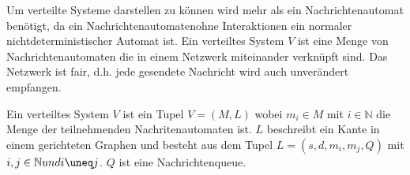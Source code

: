 Um verteilte Systeme darstellen zu können wird mehr als ein Nachrichtenautomat
benötigt, da ein Nachrichtenautomatenohne Interaktionen ein normaler
nichtdeterministischer Automat ist. Ein verteiltes System $V$ ist eine Menge von
Nachrichtenautomaten die in einem Netzwerk miteinander verknüpft sind.
Das Netzwerk ist fair, d.h. jede gesendete Nachricht wird auch unverändert
empfangen.~\cite{bickford2003logic}

\begin{defi}
  Ein verteiltes System $V$ ist ein Tupel $V=(M,L)$ wobei $m_i\in M$ mit $i\in
  \mathbb{N}$ die Menge der teilnehmenden Nachritenautomaten ist. $L$ beschreibt
  ein Kante in einem gerichteten Graphen und besteht aus dem Tupel $L=(s,d,m_i,m_j,Q)$ 
  mit $i,j\in \mathbb{N} und i \uneq j$. $Q$ ist eine Nachrichtenqueue.
\end{defi}





